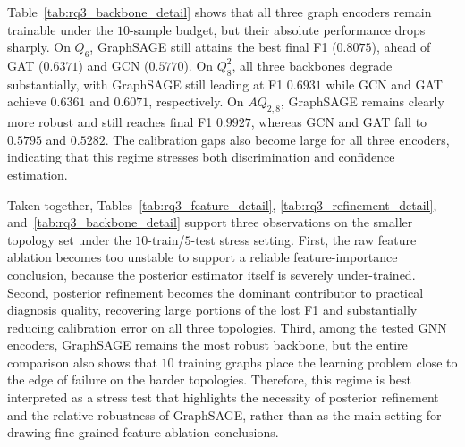 Table~\ref{tab:rq3_backbone_detail} shows that all three graph encoders remain trainable under the $10$-sample budget, but their absolute performance drops sharply. On $Q_6$, GraphSAGE still attains the best final F1 ($0.8075$), ahead of GAT ($0.6371$) and GCN ($0.5770$). On $Q_8^2$, all three backbones degrade substantially, with GraphSAGE still leading at F1 $0.6931$ while GCN and GAT achieve $0.6361$ and $0.6071$, respectively. On $AQ_{2,8}$, GraphSAGE remains clearly more robust and still reaches final F1 $0.9927$, whereas GCN and GAT fall to $0.5795$ and $0.5282$. The calibration gaps also become large for all three encoders, indicating that this regime stresses both discrimination and confidence estimation.

Taken together, Tables~\ref{tab:rq3_feature_detail}, \ref{tab:rq3_refinement_detail}, and~\ref{tab:rq3_backbone_detail} support three observations on the smaller topology set under the $10$-train/$5$-test stress setting. First, the raw feature ablation becomes too unstable to support a reliable feature-importance conclusion, because the posterior estimator itself is severely under-trained. Second, posterior refinement becomes the dominant contributor to practical diagnosis quality, recovering large portions of the lost F1 and substantially reducing calibration error on all three topologies. Third, among the tested GNN encoders, GraphSAGE remains the most robust backbone, but the entire comparison also shows that $10$ training graphs place the learning problem close to the edge of failure on the harder topologies. Therefore, this regime is best interpreted as a stress test that highlights the necessity of posterior refinement and the relative robustness of GraphSAGE, rather than as the main setting for drawing fine-grained feature-ablation conclusions.
